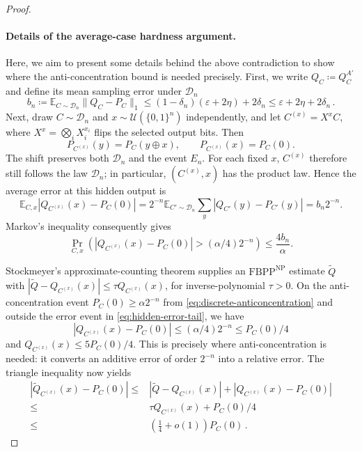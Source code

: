 \documentclass{article}
\theoremstyle{plain}
\theoremstyle{definition}
\theoremstyle{remark}
\begin{document}
\begin{proof}
\paragraph{Details of the average-case hardness argument.} Here, we aim to present some details behind the above contradiction to show where the anti-concentration bound is needed precisely. First, we write $Q_C \coloneqq Q_C^{A'}$ and define its mean sampling error under $\mathcal{D}_n$
\begin{equation} \label{eq:mean-sampling-error}
    b_n \coloneqq \mathbb{E}_{C\sim\mathcal{D}_n}\|Q_C-P_C\|_1 \leq(1-\delta_n)(\varepsilon+2\eta)+2\delta_n \leq\varepsilon+2\eta+2\delta_n\,.
\end{equation}
Next, draw $C\sim\mathcal D_n$ and $x\sim\mathcal{U}(\{0,1\}^n)$
independently, and let $C^{(x)}=X^xC$, where $X^x=\bigotimes_iX_i^{x_i}$ flips the selected output bits. Then
\begin{equation}
 P_{C^{(x)}}(y)=P_C(y\oplus x),\qquad
 P_{C^{(x)}}(x)=P_C(0).
 \label{eq:appendix-output-hiding}
\end{equation}
The shift preserves both $\mathcal{D}_n$ and the event $E_n$. For each fixed $x$, $C^{(x)}$ therefore still follows the law $\mathcal{D}_n$; in particular, $(C^{(x)},x)$ has the product law. Hence the average error at this
hidden output is
\begin{equation}
    \mathbb{E}_{C,x}|Q_{C^{(x)}}(x)-P_C(0)| =2^{-n}\mathbb E_{C'\sim\mathcal D_n} \sum_y|Q_{C'}(y)-P_{C'}(y)| =b_n2^{-n}.
\end{equation}
Markov's inequality consequently gives
\begin{equation}\label{eq:hidden-error-tail}
    \Pr_{C,x}\left(|Q_{C^{(x)}}(x)-P_C(0)|>(\alpha/4)2^{-n}\right) \leq\frac{4b_n}{\alpha}.
\end{equation}

Stockmeyer's approximate-counting theorem supplies an $\mathrm{FBPP}^{\mathrm{NP}}$ estimate $\widetilde Q$ with
$|\widetilde Q-Q_{C^{(x)}}(x)|\leq\tau Q_{C^{(x)}}(x)$, for inverse-polynomial $\tau>0$. On the anti-concentration event $P_C(0)\geq\alpha2^{-n}$ from \cref{eq:discrete-anticoncentration} and outside the error event in \cref{eq:hidden-error-tail}, we have
$$
|Q_{C^{(x)}}(x)-P_C(0)| \leq(\alpha/4)2^{-n} \leq P_C(0)/4
$$
and $Q_{C^{(x)}}(x) \leq 5P_C(0)/4$.
This is precisely where anti-concentration is needed: it converts an additive error of order $2^{-n}$ into a relative error. The triangle inequality now yields
\begin{align}
        |\widetilde Q_{C^{(x)}}(x)-P_C(0)| \leq&|\widetilde{Q}-Q_{C^{(x)}}(x)|+|Q_{C^{(x)}}(x)-P_C(0)| \\ \leq&\tau Q_{C^{(x)}}(x) + P_C(0)/4 \\ \leq& \left(\tfrac14+o(1)\right)P_C(0) \,.
\end{align}


\end{proof}
\end{document}
